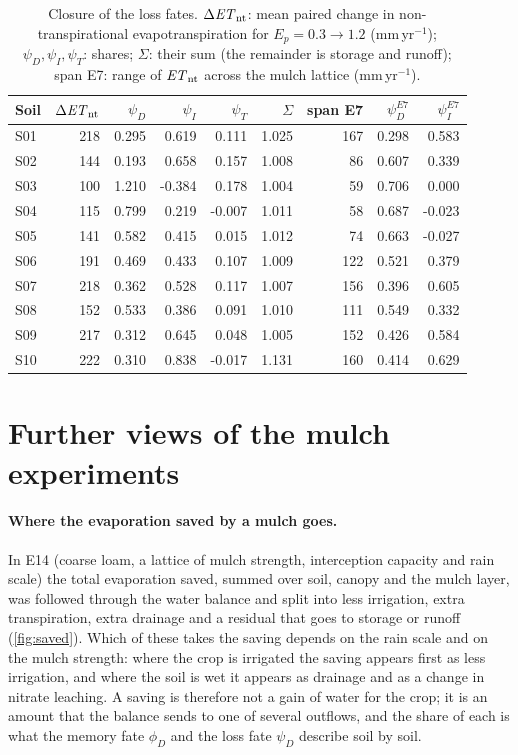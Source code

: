 \begin{table}[H]\centering\small
\caption{Closure of the loss fates. $\Delta\mathit{ET}_{\mathrm{nt}}$: mean paired change in non-transpirational evapotranspiration for $E_p=0.3\to1.2$ (mm\,yr$^{-1}$); $\psi_D,\psi_I,\psi_T$: shares; $\Sigma$: their sum (the remainder is storage and runoff); span E7: range of $\mathit{ET}_{\mathrm{nt}}$ across the mulch lattice (mm\,yr$^{-1}$).}
\label{tab:closure}
\begin{tabular}{lrrrrrrrr}
\toprule
Soil & $\Delta\mathit{ET}_{\mathrm{nt}}$ & $\psi_D$ & $\psi_I$ & $\psi_T$ & $\Sigma$ & span E7 & $\psi_D^{E7}$ & $\psi_I^{E7}$\\\midrule
S01 & 218 & 0.295 & 0.619 & 0.111 & 1.025 & 167 & 0.298 & 0.583\\
S02 & 144 & 0.193 & 0.658 & 0.157 & 1.008 & 86 & 0.607 & 0.339\\
S03 & 100 & 1.210 & -0.384 & 0.178 & 1.004 & 59 & 0.706 & 0.000\\
S04 & 115 & 0.799 & 0.219 & -0.007 & 1.011 & 58 & 0.687 & -0.023\\
S05 & 141 & 0.582 & 0.415 & 0.015 & 1.012 & 74 & 0.663 & -0.027\\
S06 & 191 & 0.469 & 0.433 & 0.107 & 1.009 & 122 & 0.521 & 0.379\\
S07 & 218 & 0.362 & 0.528 & 0.117 & 1.007 & 156 & 0.396 & 0.605\\
S08 & 152 & 0.533 & 0.386 & 0.091 & 1.010 & 111 & 0.549 & 0.332\\
S09 & 217 & 0.312 & 0.645 & 0.048 & 1.005 & 152 & 0.426 & 0.584\\
S10 & 222 & 0.310 & 0.838 & -0.017 & 1.131 & 160 & 0.414 & 0.629\\
\bottomrule
\end{tabular}
\end{table}

\section{Further views of the mulch experiments}\label{app:mulchviews}
\paragraph{Where the evaporation saved by a mulch goes.}
In E14 (coarse loam, a lattice of mulch strength, interception capacity and rain scale) the total evaporation saved, summed over soil, canopy and the mulch layer, was followed through the water balance and split into less irrigation, extra transpiration, extra drainage and a residual that goes to storage or runoff (\cref{fig:saved}). Which of these takes the saving depends on the rain scale and on the mulch strength: where the crop is irrigated the saving appears first as less irrigation, and where the soil is wet it appears as drainage and as a change in nitrate leaching. A saving is therefore not a gain of water for the crop; it is an amount that the balance sends to one of several outflows, and the share of each is what the memory fate $\phi_D$ and the loss fate $\psi_D$ describe soil by soil.


